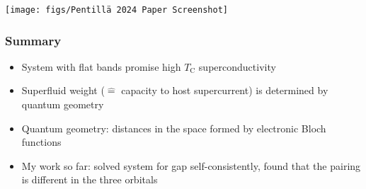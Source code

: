 \documentclass[aspectratio=169]{beamer}
\begin{document}
\begin{frame}
	
	\begin{center}
		\texttt{[image: figs/Pentillä 2024 Paper Screenshot]}
	\end{center}
\end{frame}


\begin{frame}
	\frametitle{Summary}
	
	\begin{itemize}
		\item System with flat bands promise high \(T_{\mathrm{C}}\) superconductivity\pause
		\item Superfluid weight (\(\hat{=}\) capacity to host supercurrent) is determined by quantum geometry\pause
		\item Quantum geometry: distances in the space formed by electronic Bloch functions\pause
		\item My work so far: solved system for gap self-consistently, found that the pairing is different in the three orbitals
	\end{itemize}	
\end{frame}

	
	
	
	
	
\end{document}
